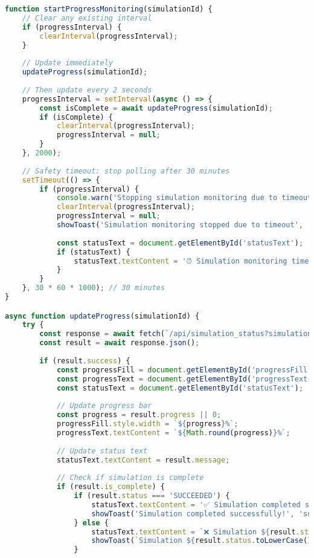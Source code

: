 \documentclass[12pt,a4paper]{article}
\begin{document}
\begin{lstlisting}[language=JavaScript, caption=Progress Monitoring System]
function startProgressMonitoring(simulationId) {
    // Clear any existing interval
    if (progressInterval) {
        clearInterval(progressInterval);
    }
    
    // Update immediately
    updateProgress(simulationId);
    
    // Then update every 2 seconds
    progressInterval = setInterval(async () => {
        const isComplete = await updateProgress(simulationId);
        if (isComplete) {
            clearInterval(progressInterval);
            progressInterval = null;
        }
    }, 2000);
    
    // Safety timeout: stop polling after 30 minutes
    setTimeout(() => {
        if (progressInterval) {
            console.warn('Stopping simulation monitoring due to timeout (30 minutes)');
            clearInterval(progressInterval);
            progressInterval = null;
            showToast('Simulation monitoring stopped due to timeout', 'info');
            
            const statusText = document.getElementById('statusText');
            if (statusText) {
                statusText.textContent = '⏰ Simulation monitoring timed out after 30 minutes';
            }
        }
    }, 30 * 60 * 1000); // 30 minutes
}

async function updateProgress(simulationId) {
    try {
        const response = await fetch(`/api/simulation_status?simulation_id=${simulationId}`);
        const result = await response.json();
        
        if (result.success) {
            const progressFill = document.getElementById('progressFill');
            const progressText = document.getElementById('progressText');
            const statusText = document.getElementById('statusText');
            
            // Update progress bar
            const progress = result.progress || 0;
            progressFill.style.width = `${progress}%`;
            progressText.textContent = `${Math.round(progress)}%`;
            
            // Update status text
            statusText.textContent = result.message;
            
            // Check if simulation is complete
            if (result.is_complete) {
                if (result.status === 'SUCCEEDED') {
                    statusText.textContent = '✅ Simulation completed successfully!';
                    showToast('Simulation completed successfully!', 'success');
                } else {
                    statusText.textContent = `❌ Simulation ${result.status.toLowerCase()}`;
                    showToast(`Simulation ${result.status.toLowerCase()}`, 'error');
                }
                

\end{lstlisting}
\end{document}
